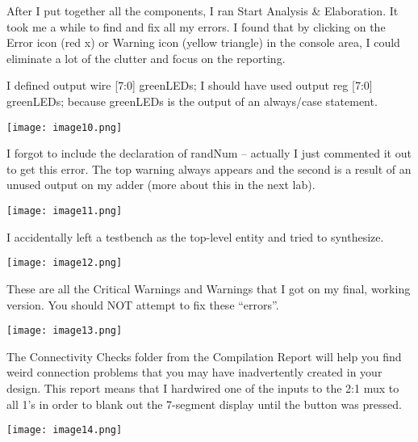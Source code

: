 After I put together all the components, I ran Start Analysis \&
Elaboration. It took me a while to find and fix all my errors. I found
that by clicking on the Error icon (red x) or Warning icon (yellow
triangle) in the console area, I could eliminate a lot of the clutter
and focus on the reporting.

I defined output wire {[}7:0{]} greenLEDs; I should have used output reg
{[}7:0{]} greenLEDs; because greenLEDs is the output of an always/case
statement.

\texttt{[image: image10.png]}

I forgot to include the declaration of randNum -- actually I just
commented it out to get this error. The top warning always appears and
the second is a result of an unused output on my adder (more about this
in the next lab).

\texttt{[image: image11.png]}

I accidentally left a testbench as the top-level entity and tried to
synthesize.

\texttt{[image: image12.png]}

These are all the Critical Warnings and Warnings that I got on my final,
working version. You should NOT attempt to fix these ``errors''.

\texttt{[image: image13.png]}

The Connectivity Checks folder from the Compilation Report will help you
find weird connection problems that you may have inadvertently created
in your design. This report means that I hardwired one of the inputs to
the 2:1 mux to all 1's in order to blank out the 7-segment display until
the button was pressed.

\texttt{[image: image14.png]}
